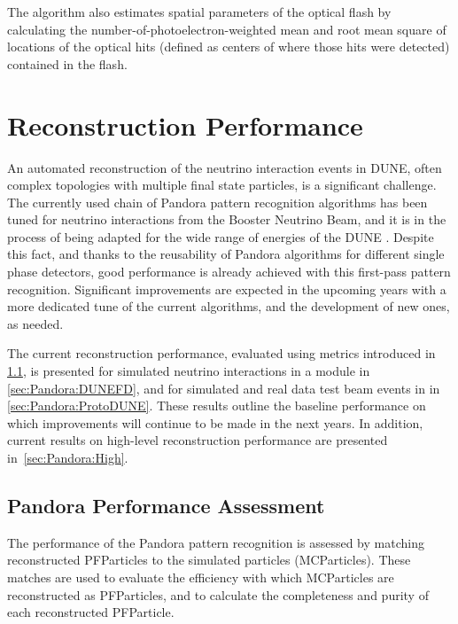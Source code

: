 The algorithm also estimates spatial parameters of the optical flash
by calculating the number-of-photoelectron-weighted mean and 
root mean square of locations of the optical hits
(defined as centers of  where those hits were detected)
contained in the flash.

\section{Reconstruction Performance}
\label{sec:performance}

An automated reconstruction of the neutrino interaction events in DUNE, often complex topologies with multiple final state particles, is a significant challenge. The currently used chain of Pandora pattern recognition algorithms %
has been tuned for neutrino interactions from the \fnal Booster Neutrino Beam, and it is in the process of being adapted for the wide range of energies of the DUNE . Despite this fact, and thanks to the reusability of Pandora algorithms for different single phase \lartpc detectors,  good performance is already achieved with this first-pass pattern recognition. Significant improvements are expected  in the upcoming years with a more dedicated tune of the current algorithms, and the development of new ones, as needed. %

The current reconstruction performance, evaluated using metrics introduced in \ref{sec:Pandora:assessment}, is presented for simulated neutrino interactions in a \single \nominalmodsize {} module in \ref{sec:Pandora:DUNEFD}, and for simulated and real data test beam events in  in \ref{sec:Pandora:ProtoDUNE}. These results outline the baseline performance on which improvements will continue to be made in the next years. In addition, current results on high-level reconstruction performance are presented in~\ref{sec:Pandora:High}.

\subsection{Pandora Performance Assessment}
\label{sec:Pandora:assessment}
The performance of the Pandora pattern recognition is assessed by matching reconstructed PFParticles to the simulated  particles (MCParticles). These matches are used to evaluate the efficiency with which MCParticles are reconstructed as PFParticles, and to calculate the completeness and purity of each reconstructed PFParticle. 

